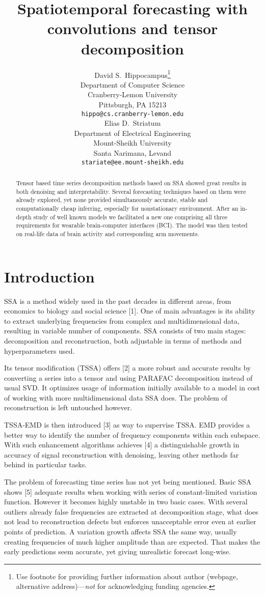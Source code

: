 \documentclass{article}
\title{Spatiotemporal forecasting with convolutions and tensor decomposition}
\author{ David S.~Hippocampus\thanks{Use footnote for providing further
		information about author (webpage, alternative
		address)---\emph{not} for acknowledging funding agencies.} \\
	Department of Computer Science\\
	Cranberry-Lemon University\\
	Pittsburgh, PA 15213 \\
	\texttt{hippo@cs.cranberry-lemon.edu} \\
	\And
	Elias D.~Striatum \\
	Department of Electrical Engineering\\
	Mount-Sheikh University\\
	Santa Narimana, Levand \\
	\texttt{stariate@ee.mount-sheikh.edu} \\
}
\date{}
\begin{document}
\maketitle

\begin{abstract}
Tensor based time series decomposition methods based on SSA showed great results in both denoising and interpretability. Several forecasting techniques based on them were already explored, yet none provided simultaneously accurate, stable and computationally cheap inferring, especially for nonstationary environment. After an in-depth study of well known models we facilitated a new one comprising all three requirements for wearable brain-computer interfaces (BCI). The model was then tested on real-life data of brain activity and corresponding arm movements.
\end{abstract}



\section{Introduction}
SSA is a method widely used in the past decades in different areas, from economics to biology and social science [1].  One of main advantages is its ability to extract underlying frequencies from complex and multidimensional data, resulting in  variable number of components. SSA consists of two main stages: decomposition and reconstruction, both adjustable in terms of methods and hyperparameters used.

Its tensor modification (TSSA) offers [2] a more robust and accurate results by converting a series into a tensor and using PARAFAC decomposition instead of usual SVD. It optimizes usage of information initially available to a model in cost of working with more multidimensional data SSA does. The problem of reconstruction is left untouched however.

TSSA-EMD is then introduced [3] as way to supervise TSSA. EMD provides a better way
to identify the number of frequency components within each subspace. With such enhancement algorithms achieves [4] a distinguishable growth in accuracy of signal reconstruction with denoising, leaving other methods far behind in particular tasks.

The problem of forecasting time series has not yet being mentioned. Basic SSA shows [5] adequate results when working with series of constant-limited variation function. However it becomes highly unstable in two basic cases. With several outliers already false frequencies are extracted at decomposition stage, what does not lead to reconstruction defects but enforces unacceptable error even at earlier points of prediction. A variation growth affects SSA the same way, usually creating frequencies of much higher amplitude than are expected. That makes the early predictions seem accurate, yet giving unrealistic forecast long-wise.
\end{document}
